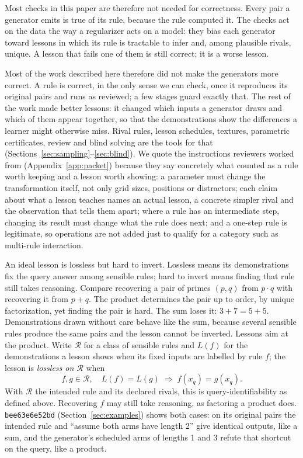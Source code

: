 \documentclass[11pt]{article}
\newcommand{\gen}[1]{\texttt{#1}}
\begin{document}
Most checks in this paper are therefore not needed for correctness. Every pair a
generator emits is true of its rule, because the rule computed it. The checks
act on the data the way a regularizer acts on a model: they bias each generator
toward lessons in which its rule is tractable to infer and, among plausible
rivals, unique. A lesson that fails one of them is still correct; it is a worse
lesson.

Most of the work described here therefore did not make the generators more
correct. A rule is correct, in the only sense we can check, once it reproduces
its original pairs and runs as reviewed; a few stages guard exactly that. The
rest of the work made better lessons: it changed which inputs a generator draws
and which of them appear together, so that the demonstrations show the
differences a learner might otherwise miss. Rival rules, lesson schedules,
textures, parametric certificates, review and blind solving are the tools for
that (Sections~\ref{sec:sampling}--\ref{sec:blind}). We quote the instructions
reviewers worked from (Appendix~\ref{app:packet}) because they say concretely
what counted as a rule worth keeping and a lesson worth showing: a parameter
must change the transformation itself, not only grid sizes, positions or
distractors; each claim about what a lesson teaches names an actual lesson, a
concrete simpler rival and the observation that tells them apart; where a rule
has an intermediate step, changing its result must change what the rule does
next; and a one-step rule is legitimate, so operations are not added just to
qualify for a category such as multi-rule interaction.

An ideal lesson is lossless but hard to invert. Lossless means its
demonstrations fix the query answer among sensible rules; hard to invert means
finding that rule still takes reasoning. Compare recovering a
pair of primes $(p,q)$ from $p\cdot q$ with recovering it from $p+q$. The
product determines the pair up to order, by unique factorization, yet finding
the pair is hard. The sum loses it: $3+7=5+5$. Demonstrations drawn without
care behave like the sum, because several sensible rules produce the same
pairs and the lesson cannot be inverted. Lessons aim at the product. Write
$\mathcal R$ for a class of sensible rules and $L(f)$ for the demonstrations
a lesson shows when its fixed inputs are labelled by rule $f$; the lesson is \emph{lossless on $\mathcal R$} when
\[
  f,g\in\mathcal R,\quad L(f)=L(g)\;\Rightarrow\; f(x_q)=g(x_q).
\]
With $\mathcal R$ the intended rule and its declared rivals, this is
query-identifiability as defined above. Recovering $f$ may still take
reasoning, as factoring a product does.
\gen{bee63e6e52bd} (Section~\ref{sec:examples}) shows both cases: on its
original pairs the intended rule and ``assume both arms have length 2'' give
identical outputs, like a sum, and the generator's scheduled arms of lengths 1
and 3 refute that shortcut on the query, like a product.
\end{document}
